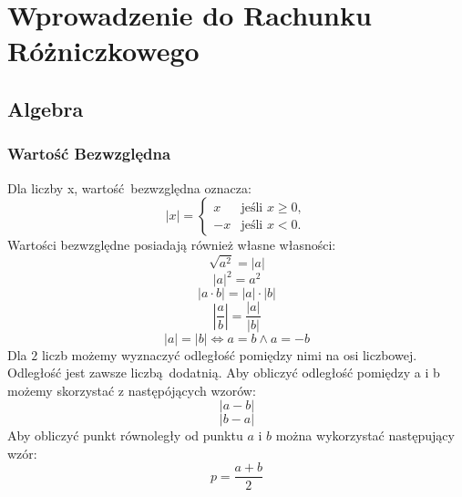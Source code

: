 \documentclass[12pt, a4paper]{article}
\begin{document}
\tableofcontents
\newpage
\section{Wprowadzenie do Rachunku Różniczkowego}
\subsection{Algebra}


\subsubsection{Wartość Bezwzględna}
Dla liczby x, wartość bezwzględna oznacza:
$$
|x| =
\begin{cases}
  x & \text{jeśli } x \geq 0, \\
  -x & \text{jeśli } x < 0.
\end{cases}
$$
Wartości bezwzględne posiadają również własne własności:
$$\sqrt{a^2} = \left|a\right|$$
$$\left|a\right|^2 = a^2$$
$$\left|a \cdot b\right| = \left| a \right| \cdot \left| b \right|$$
$$\left|\frac{a}{b}\right| = \frac{\left|a\right|}{\left|b\right|}$$
$$\left|a\right|=\left|b\right| \Longleftrightarrow a=b \wedge a = -b$$
Dla $2$ liczb możemy wyznaczyć odległość pomiędzy nimi na osi liczbowej. Odległość jest zawsze liczbą dodatnią.
Aby obliczyć odległość pomiędzy a i b możemy skorzystać z następójących wzorów:
$$\left|a-b\right|$$
$$\left|b-a\right|$$
Aby obliczyć punkt równoległy od punktu $a$ i $b$ można wykorzystać następujący wzór:
$$p = \frac{a+b}{2}$$
\end{document}
